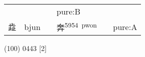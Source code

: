 \documentclass[14pt,a4paper]{scrartcl}
\begin{document}
\begin{longtable}[c]{@{}llllll@{}}
\begin{minipage}[t]{0.14\columnwidth}
\strut\end{minipage} &
\begin{minipage}[t]{0.14\columnwidth}\raggedright\strut
\strut\end{minipage} &
\begin{minipage}[t]{0.14\columnwidth}\raggedright\strut
\strut\end{minipage} &
\begin{minipage}[t]{0.14\columnwidth}\raggedright\strut
pure:B
\strut\end{minipage}\tabularnewline
\begin{minipage}[t]{0.14\columnwidth}\raggedright\strut
歮
\strut\end{minipage} &
\begin{minipage}[t]{0.14\columnwidth}\raggedright\strut
bjun
\strut\end{minipage} &
\begin{minipage}[t]{0.14\columnwidth}\raggedright\strut
\strut\end{minipage} &
\begin{minipage}[t]{0.14\columnwidth}\raggedright\strut
奔\textsuperscript{5954~pwon}
\strut\end{minipage} &
\begin{minipage}[t]{0.14\columnwidth}\raggedright\strut
\strut\end{minipage} &
\begin{minipage}[t]{0.14\columnwidth}\raggedright\strut
pure:A
\strut\end{minipage}\tabularnewline
\bottomrule
\end{longtable}

(100) 0443 {[}2{]}
\end{document}
